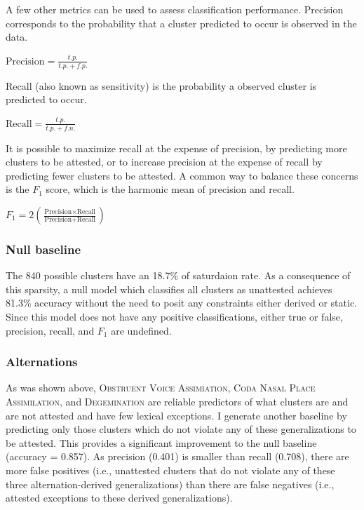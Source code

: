 \noindent A few other metrics can be used to assess classification performance. Precision corresponds to the probability that a cluster predicted to occur is observed in the data. 

\begin{unlabeledexample}
$\displaystyle \textrm{Precision} = \frac{t.p.}{t.p. + f.p.}$ 
\end{unlabeledexample}

\noindent Recall (also known as sensitivity) is the probability a observed cluster is predicted to occur. 

\begin{unlabeledexample}
$\displaystyle \textrm{Recall} = \frac{t.p.}{t.p. + f.n.}$
\end{unlabeledexample}

It is possible to maximize recall at the expense of precision, by predicting more clusters to be attested, or to increase precision at the expense of recall by predicting fewer clusters to be attested. A common way to balance these concerns is the $F_1$ score, which is the harmonic mean of precision and recall.

\begin{unlabeledexample}
$\displaystyle F_1 = 2 \left( \frac{\textrm{Precision} \times \textrm{Recall}}{\textrm{Precision} + \textrm{Recall}}\right)$ 
\end{unlabeledexample}

\subsubsection{Null baseline}

The 840 possible clusters have an 18.7\% of saturdaion rate. As a consequence of this sparsity, a null model which classifies all clusters as unattested achieves 81.3\% accuracy without the need to posit any constraints either derived or static. Since this model does not have any positive classifications, either true or false, precision, recall, and $F_1$ are undefined.

\subsubsection{Alternations}

As was shown above, \textsc{Obstruent Voice Assimiation}, \textsc{Coda Nasal Place Assimilation}, and \textsc{Degemination} are reliable predictors of what clusters are and are not attested and have few lexical exceptions. I generate another baseline by predicting only those clusters which do not violate any of these generalizations to be attested. This provides a significant improvement to the null baseline (accuracy = 0.857). As precision (0.401) is smaller than recall (0.708), there are more false positives (i.e., unattested clusters that do not violate any of these three alternation-derived generalizations) than there are false negatives (i.e., attested exceptions to these derived generalizations). 


